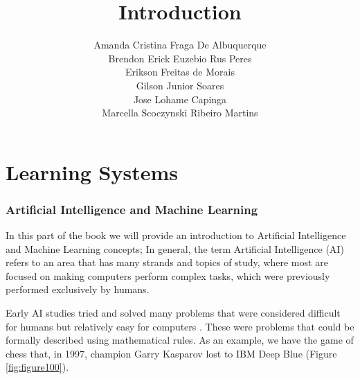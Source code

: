 \part{Learning Systems}

%

\title{Introduction}
\author{Amanda Cristina Fraga De Albuquerque\\
        Brendon Erick Euzebio Rus Peres\\
        Erikson Freitas de Morais\\
        Gilson Junior Soares\\
        Jose Lohame Capinga\\
        Marcella Scoczynski Ribeiro Martins}

%
\maketitle

\section{Artificial Intelligence and Machine Learning}

In this part of the book we will provide an introduction to Artificial Intelligence and Machine Learning concepts;
In general, the term Artificial Intelligence (AI) refers to an area that has many strands and topics of study, where most are focused on making computers perform complex tasks, which were previously performed exclusively by humans.

Early AI studies tried and solved many problems that were considered difficult for humans but relatively easy for computers \cite{goodfellow2016}. These were problems that could be formally described using mathematical rules. As an example, we have the game of chess that, in 1997, champion Garry Kasparov lost to IBM Deep Blue (Figure \ref{fig:figure100}).

